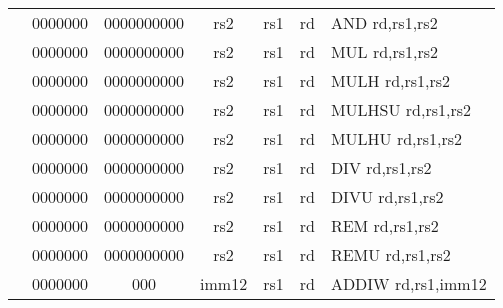 \begin{table}[p]
\begin{small}
\begin{center}
\begin{tabular}{rcccccccccl}
&
\multicolumn{1}{|c|}{0000000} &
\multicolumn{5}{c|}{0000000000} &
\multicolumn{1}{c|}{rs2} &
\multicolumn{1}{c|}{rs1} &
\multicolumn{1}{c|}{rd} & AND rd,rs1,rs2 \\
\cline{2-10}
  

&
\multicolumn{1}{|c|}{0000000} &
\multicolumn{5}{c|}{0000000000} &
\multicolumn{1}{c|}{rs2} &
\multicolumn{1}{c|}{rs1} &
\multicolumn{1}{c|}{rd} & MUL rd,rs1,rs2 \\
\cline{2-10}
  

&
\multicolumn{1}{|c|}{0000000} &
\multicolumn{5}{c|}{0000000000} &
\multicolumn{1}{c|}{rs2} &
\multicolumn{1}{c|}{rs1} &
\multicolumn{1}{c|}{rd} & MULH rd,rs1,rs2 \\
\cline{2-10}
  

&
\multicolumn{1}{|c|}{0000000} &
\multicolumn{5}{c|}{0000000000} &
\multicolumn{1}{c|}{rs2} &
\multicolumn{1}{c|}{rs1} &
\multicolumn{1}{c|}{rd} & MULHSU rd,rs1,rs2 \\
\cline{2-10}
  

&
\multicolumn{1}{|c|}{0000000} &
\multicolumn{5}{c|}{0000000000} &
\multicolumn{1}{c|}{rs2} &
\multicolumn{1}{c|}{rs1} &
\multicolumn{1}{c|}{rd} & MULHU rd,rs1,rs2 \\
\cline{2-10}
  

&
\multicolumn{1}{|c|}{0000000} &
\multicolumn{5}{c|}{0000000000} &
\multicolumn{1}{c|}{rs2} &
\multicolumn{1}{c|}{rs1} &
\multicolumn{1}{c|}{rd} & DIV rd,rs1,rs2 \\
\cline{2-10}
  

&
\multicolumn{1}{|c|}{0000000} &
\multicolumn{5}{c|}{0000000000} &
\multicolumn{1}{c|}{rs2} &
\multicolumn{1}{c|}{rs1} &
\multicolumn{1}{c|}{rd} & DIVU rd,rs1,rs2 \\
\cline{2-10}
  

&
\multicolumn{1}{|c|}{0000000} &
\multicolumn{5}{c|}{0000000000} &
\multicolumn{1}{c|}{rs2} &
\multicolumn{1}{c|}{rs1} &
\multicolumn{1}{c|}{rd} & REM rd,rs1,rs2 \\
\cline{2-10}
  

&
\multicolumn{1}{|c|}{0000000} &
\multicolumn{5}{c|}{0000000000} &
\multicolumn{1}{c|}{rs2} &
\multicolumn{1}{c|}{rs1} &
\multicolumn{1}{c|}{rd} & REMU rd,rs1,rs2 \\
\cline{2-10}
  

&
\multicolumn{1}{|c|}{0000000} &
\multicolumn{2}{c|}{000} &
\multicolumn{4}{c|}{imm12} &
\multicolumn{1}{c|}{rs1} &
\multicolumn{1}{c|}{rd} & ADDIW rd,rs1,imm12 \\
\cline{2-10}
  


\end{tabular}
\end{center}
\end{small}
\end{table}
